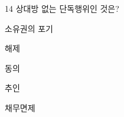 \begin{question}{14}
상대방 없는 단독행위인 것은?
\begin{choices}
  \item 소유권의 포기
  \item 해제
  \item 동의
  \item 추인
  \item 채무면제
\end{choices}
\end{question}

